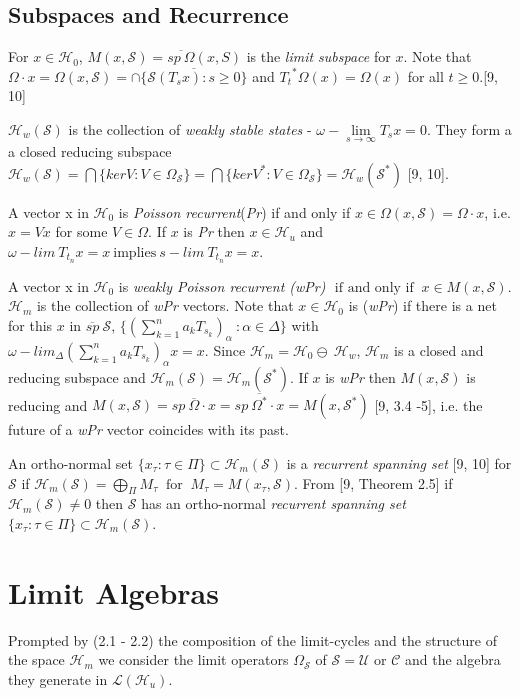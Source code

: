 \documentclass[req no]{amsart}[16pt]
\theoremstyle{plain}
\theoremstyle{definition}
\numberwithin{equation}{section}\setcounter{page}{1}
\def\m{\mbox}
\def\mf{\m{ for }}
\def\ii{\m{ if and only if }}
\def\o{\omega}
\def\O{\Omega}
\def\h{\mathcal{H}}
\def\L {\mathcal{L}}
\def\s{\mathcal{S}}
\def\C{\mathcal{C}}
\def\U{\mathcal{U}}
\begin{document}
\subsection{Subspaces and Recurrence}
For $x \in \h_{0}$, $M(x,\s)=\overline{sp~\Omega}(x,S)$ is the \textit{limit subspace} for $x$. Note that $\O \cdot x =\Omega(x,\s) =\cap \{ \overline{\s(T_{s}x): s\geq 0}\}$ and ${T_{t}}^{*} \Omega(x)=\Omega(x)$ for all $t \geq 0$.[9, 10]

$\h_w(\s)$ is the collection of \textit{weakly stable states} - $\o-\lim\limits_{s\rightarrow \infty} T_s x = 0$. They form a a closed reducing subspace $\h_w(\s) = \bigcap \{ ker V : V \in \Omega_{\s}\}=\bigcap \{ ker V^{*} : V \in \Omega_{\s}\}=\h_w(\s^{*})$ [9, 10].

 A vector x in $\h_{0}$ is \emph{Poisson recurrent}(\emph{Pr}) if and only if  $x \in \Omega(x, \s)= \O \cdot x$, i.e. $x = Vx$ for some $V \in \Omega$. If $x$ is \emph{Pr} then $x \in \h_{u}$ and $\o -lim~ T_{t_{n}}x = x ~\m{implies}~ s-lim ~T_{t_{n}}x = x$.

A vector x in $\h_{0}$ is \emph{ weakly Poisson recurrent (wPr)} $\ii ~ x \in M(x, \s)$. $\h_m$ is the collection of \emph{wPr} vectors. Note that $x \in \h_{0}$ is (\emph{wPr}) if there is a net for this $x$ in $\overline{sp}~ \s$, $\{(\sum\limits^{n}_{k=1}a_{k}T_{s_k} )_{\alpha}  ~: \alpha \in \Delta \}$ with $\o-lim_{\Delta} (\sum\limits^{n}_{k=1}a_{k}T_{s_k} )_{\alpha}x = x$. Since $\h_{m}= \h_{0}\ominus \ \h_{w}$, $\h_m$ is a closed and reducing subspace and $\h_{m}(\s) =  \h_{m}(\s^{*})$. If $x$ is \emph{wPr} then $M(x, \s)$ is reducing and $M(x,\s)=\overline{sp~\Omega \cdot x}=\overline{sp~\Omega^{*} \cdot x} = M(x,\s^{*})$ [9, 3.4 -5], i.e. the future of a \emph{wPr} vector coincides with its past.

An ortho-normal set $\{x_{\tau}: \tau \in \Pi\}\subset \h_{m}(\s) $ is a \emph{recurrent spanning set} [9, 10] for $\s$ if $\h_{m}(\s) = \bigoplus_{\Pi} M_{\tau} ~ \mf ~ M_{\tau}= M(x_{\tau}, \s)$. From [9, Theorem 2.5] if $\h_{m}(\s) \neq 0$ then $\s$ has an ortho-normal  \emph{recurrent spanning set} $\{x_{\tau}: \tau \in \Pi\}\subset \h_{m}(\s) $.



\section{Limit Algebras}
Prompted by (2.1 - 2.2) the composition of the limit-cycles and the structure of the space $\h_{m}$ we consider the limit operators $\O_{\s}$ of $\s=\U $ or $ \C$ and the algebra they generate in $\L(\h_{u})$.
\end{document}
